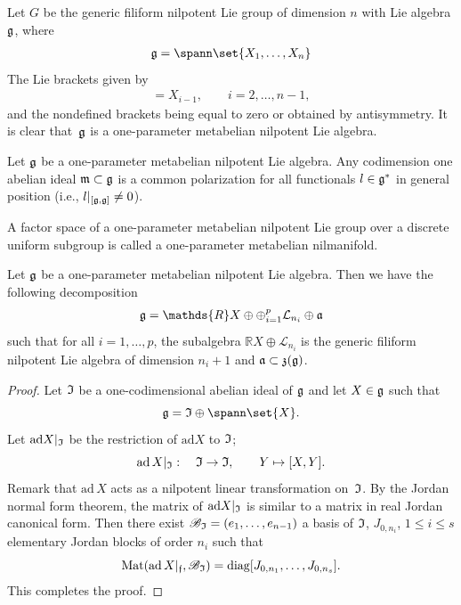  \begin{example}
  Let $G$ be the generic f\/iliform
nilpotent Lie group of dimension $n$ with Lie algebra $\frak g$,
where
\begin{gather*}
 \frak g = \spann\set{X_1,
\ldots, X_n}
\end{gather*}
The Lie brackets  given by
\begin{gather*}
[X_n, X_i] = X_{i-1},  \qquad i=2,\ldots,  n-1,
\end{gather*}
and the nondef\/ined brackets being equal to zero or obtained by
antisymmetry. It is clear that~$\frak g$ is a one-parameter
metabelian nilpotent Lie algebra.
\end{example}

\begin{remark} Let $\frak g$ be a one-parameter metabelian
 nilpotent Lie algebra. Any
codimension one abelian ideal $\frak m\subset \frak g$ is a common
polarization for all functionals $l\in \frak g^*$ in general
position (i.e.,  $l\vert_{[\frak g, \frak g]}\ne 0$).
\end{remark}


\begin{definition}\sloppy
A factor space of a one-parameter met\-abe\-lian nilpotent Lie group
over a discrete uniform subgroup is called a one-parameter
metabelian nilmanifold.
\end{definition}


\begin{proposition}\label{decomposition-speciale} Let $\frak g$ be a
one-parameter metabelian nilpotent Lie algebra. Then we have the
following decomposition
\begin{gather*}
\frak g = \mathds{R} X \oplus \oplus_{i=1}^p \mathcal{L}_{n_i}
\oplus \frak a
\end{gather*}
such that for all $i=1,\ldots, p$, the subalgebra $\mathds{R} X
\oplus  \mathcal{L}_{n_i} $ is the generic filiform nilpotent Lie
algebra of dimension $n_i+1$ and $\frak a \subset \frak z(\frak g)$.
 \end{proposition}

 \begin{proof} Let $\frak I$ be a one-codimensional abelian ideal of
 $\frak  g$ and let $X\in \frak g$ such that
\[
\frak g= \frak I\oplus \spann\set{X}.
\]
 Let $\mathrm{ad} X\vert_{\frak I}$ be the
 restriction of $\mathrm{ad}
 X$ to $\frak I$;
\[
\mathrm{ad}\, X\vert_{\frak I}: \quad \frak I\rightarrow \frak I,\qquad
 Y\mapsto [X, Y].
 \]
 Remark that $\mathrm{ad}\, X$ acts as a nilpotent linear
 transformation on~$\frak I$.
 By the Jordan normal form theorem, the matrix of
 $\mathrm{ad} X\vert_{\frak I}$ is similar to a matrix in real Jordan canonical form. Then
 there exist $\mathscr{B}_{\frak I}=(e_1, \ldots, e_{n-1})$  a
 basis of $\frak I$, $J_{0, n_i}$, $1\leq i\leq s$  elementary Jordan
 blocks of order $n_i$ such that
\[
\mathrm{Mat}(\mathrm{ad}\, X\vert_{\frak
 f}, \mathscr{B}_{\frak I}) =
  \mathrm{diag}[J_{0, n_1}, \ldots, J_{0, n_s}].
\]
  This completes the proof.
 \end{proof}

